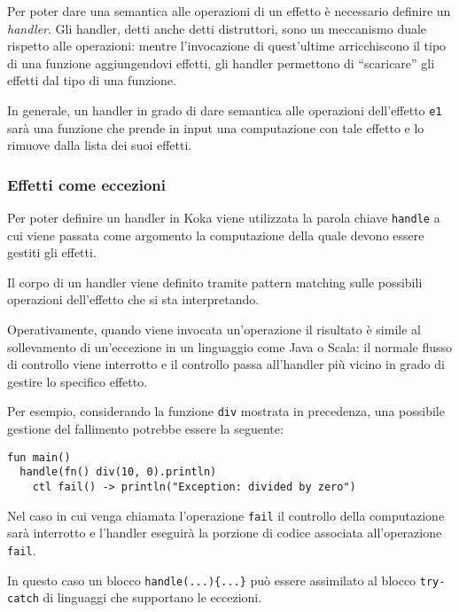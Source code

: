 Per poter dare una semantica alle operazioni di un effetto è necessario definire un \emph{handler}. Gli handler, detti anche detti distruttori, sono un meccanismo duale rispetto alle operazioni: mentre l'invocazione di quest'ultime arricchiscono il tipo di una funzione aggiungendovi effetti, gli handler permettono di ``scaricare'' gli effetti dal tipo di una funzione.

In generale, un handler in grado di dare semantica alle operazioni dell'effetto \lstinline{e1} sarà una funzione che prende in input una computazione con tale effetto e lo rimuove dalla lista dei suoi effetti.

\subsubsection{Effetti come eccezioni}
Per poter definire un handler in Koka viene utilizzata la parola chiave \lstinline{handle} a cui viene passata come argomento la computazione della quale devono essere gestiti gli effetti.

Il corpo di un handler viene definito tramite pattern matching sulle possibili operazioni dell'effetto che si sta interpretando.

Operativamente, quando viene invocata un'operazione il risultato è simile al sollevamento di un'eccezione in un linguaggio come Java o Scala: il normale flusso di controllo viene interrotto e il controllo passa all'handler più vicino in grado di gestire lo specifico effetto.

Per esempio, considerando la funzione \lstinline{div} mostrata in precedenza, una possibile gestione del fallimento potrebbe essere la seguente:
\begin{lstlisting}[language=koka]
fun main()
  handle(fn() div(10, 0).println)
    ctl fail() -> println("Exception: divided by zero")
\end{lstlisting}

Nel caso in cui venga chiamata l'operazione \lstinline{fail} il controllo della computazione sarà interrotto e l'handler eseguirà la porzione di codice associata all'operazione \lstinline{fail}.

In questo caso un blocco \lstinline|handle(...){...}| può essere assimilato al blocco \lstinline{try-catch} di linguaggi che supportano le eccezioni.

